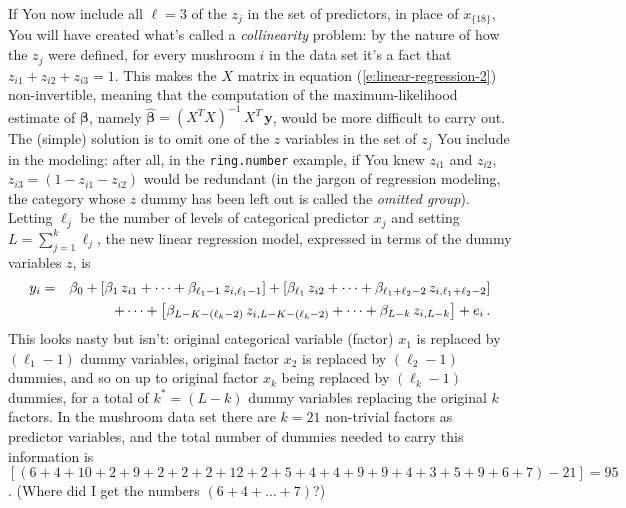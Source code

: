 \documentclass[12pt]{article}
\begin{document}
If You now include all $\ell = 3$ of the $z_j$ in the set of predictors, in place of $x_{ \{ 18 \} }$, You will have created what's called a \textit{collinearity} problem: by the nature of how the $z_j$ were defined, for every mushroom $i$ in the data set it's a fact that $z_{ i1 } + z_{ i2 } + z_{ i3 } = 1$. This makes the $X$ matrix in equation (\ref{e:linear-regression-2}) non-invertible, meaning that the computation of the maximum-likelihood estimate of $\bm{ \beta }$, namely $\hat{ \bm{ \beta } } = ( X^T X )^{ -1 } \, X^T \, \bm{ y }$, would be more difficult to carry out. The (simple) solution is to omit one of the $z$ variables in the set of $z_j$ You include in the modeling: after all, in the \texttt{ring.number} example, if You knew $z_{ i1 }$ and $z_{ i2 }$, $z_{ i3 } = ( 1 - z_{ i1 } - z_{ i2 } )$ would be redundant (in the jargon of regression modeling, the category whose $z$ dummy has been left out is called the \textit{omitted group}). Letting $\ell_j$ be the number of levels of categorical predictor $x_j$ and setting $L = \sum_{ j = 1 }^k \ell_j$, the new linear regression model, expressed in terms of the dummy variables $z$, is
\begin{eqnarray} \label{e:linear-regression-3}
y_i & = & \beta_0 + \left[ \beta_1 \, z_{ i1 } + \dots + \beta_{ \ell_1 - 1 } \, z_{ i, \ell_1 - 1 } \right] + \left[ \beta_{ \ell_1 } \, z_{ i2 } + \dots + \beta_{ \ell_1 + \ell_2 - 2 } \, z_{ i, \ell_1 + \ell_2 - 2 } \right] \\ \nonumber 
& & \hspace*{0.25in} + \dots + \left[ \beta_{ L - K - ( \ell_k - 2 ) } \, z_{ i, L - K - ( \ell_k - 2 ) } + \dots + \beta_{ L - k } \, z_{ i, L - k } \right] + e_i \, .
\end{eqnarray}
This looks nasty but isn't: original categorical variable (factor) $x_1$ is replaced by $( \ell_1 - 1 )$ dummy variables, original factor $x_2$ is replaced by $( \ell_2 - 1 )$ dummies, and so on up to original factor $x_k$ being replaced by $( \ell_k - 1 )$ dummies, for a total of $k^* = ( L - k )$ dummy variables replacing the original $k$ factors. In the mushroom data set there are  $k = 21$ non-trivial factors as predictor variables, and the total number of dummies needed to carry this information is $[ ( 6 + 4 + 10 + 2 + 9 + 2 + 2 + 2 + 12 + 2 + 5 + 4 + 4 + 9 + 9 + 4 + 3 + 5 + 9 + 6 + 7 ) - 21 ] = 95$. (Where did I get the numbers $( 6 + 4 + \dots + 7 )$?)
\end{document}
